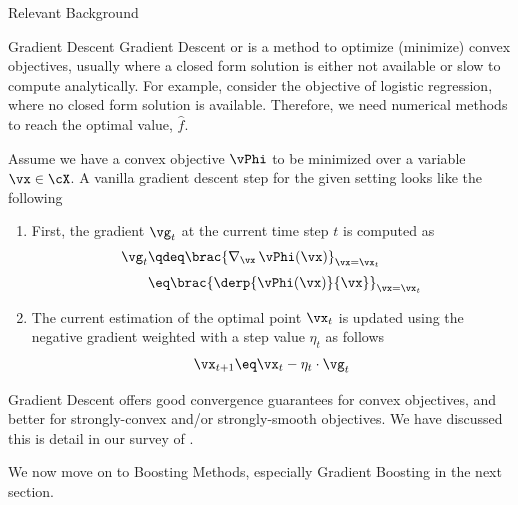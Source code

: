 \documentclass{article}
\begin{document}
\begin{psection}{Relevant Background}
\begin{psubsection}{Gradient Descent}
		Gradient Descent \citep{gd-original} or  is a method to optimize (minimize) convex objectives, usually where a closed form solution is either not available or slow to compute analytically. For example, consider the objective of logistic regression, where no closed form solution is available. Therefore, we need numerical methods to reach the optimal value, $\hat{f}$.

		Assume we have a convex objective $\vPhi$ to be minimized over a variable $\vx \in \cX$. A vanilla gradient descent step for the given setting looks like the following
		\begin{enumerate}
			\item First, the gradient $\vg_t$ at the current time step $t$ is computed as
				\begin{align*}
					\vg_t &\qdeq	\brac{\nabla_\vx\,\vPhi(\vx)}_{\vx = \vx_t} \\[.2em]
					&\eq			\brac{\derp{\vPhi(\vx)}{\vx}}_{\vx = \vx_t}
				\end{align*}
			\item The current estimation of the optimal point $\vx_t$ is updated using the negative gradient weighted with a step value $\eta_t$ as follows
				\begin{align*}
					\vx_{t + 1} \eq \vx_t - \eta_t \cdot \vg_t
				\end{align*}
		\end{enumerate}

		Gradient Descent offers good convergence guarantees for convex objectives, and better for strongly-convex and/or strongly-smooth objectives. We have discussed this is detail in our survey of .

	\end{psubsection}

	We now move on to Boosting Methods, especially Gradient Boosting in the next section.

\end{psection}
\end{document}

